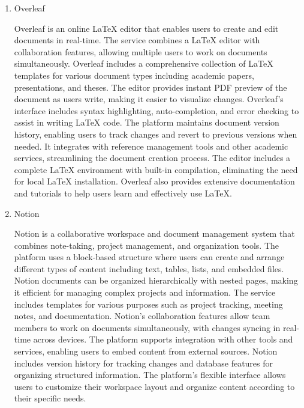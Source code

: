 \documentclass[conference]{IEEEtran}
\begin{document}
\begin{enumerate}[label=\arabic*]
    \vspace{1em}

    \item Overleaf\par
    \vspace{0.3em}
    Overleaf is an online LaTeX editor that enables users to create and edit documents in real-time. The service combines a LaTeX editor with collaboration features, allowing multiple users to work on documents simultaneously. Overleaf includes a comprehensive collection of LaTeX templates for various document types including academic papers, presentations, and theses. The editor provides instant PDF preview of the document as users write, making it easier to visualize changes. Overleaf's interface includes syntax highlighting, auto-completion, and error checking to assist in writing LaTeX code. The platform maintains document version history, enabling users to track changes and revert to previous versions when needed. It integrates with reference management tools and other academic services, streamlining the document creation process. The editor includes a complete LaTeX environment with built-in compilation, eliminating the need for local LaTeX installation. Overleaf also provides extensive documentation and tutorials to help users learn and effectively use LaTeX.

    \vspace{1em}
    
    \item Notion\par
    \vspace{0.3em}
    Notion is a collaborative workspace and document management system that combines note-taking, project management, and organization tools. The platform uses a block-based structure where users can create and arrange different types of content including text, tables, lists, and embedded files. Notion documents can be organized hierarchically with nested pages, making it efficient for managing complex projects and information. The service includes templates for various purposes such as project tracking, meeting notes, and documentation. Notion's collaboration features allow team members to work on documents simultaneously, with changes syncing in real-time across devices. The platform supports integration with other tools and services, enabling users to embed content from external sources. Notion includes version history for tracking changes and database features for organizing structured information. The platform's flexible interface allows users to customize their workspace layout and organize content according to their specific needs.


\end{enumerate}
\end{document}
